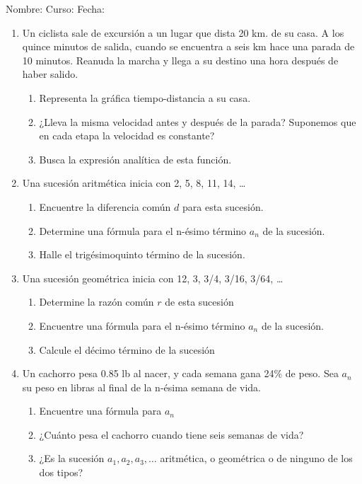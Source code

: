 \documentclass[letterpaper,fleqn]{article}
\newcommand{\LineaNombre}{%
\par
\vspace{\baselineskip}
Nombre:\hrulefill \; Curso: \underline{\hspace*{48pt}} \; Fecha: \underline{\hspace*{2.5cm}} \relax
\par}
\begin{document}
\LineaNombre
\begin{enumerate}
\item Un ciclista sale de excursión a un lugar que dista 20 km. de su casa. A los quince minutos de salida, cuando se encuentra a seis km hace una parada de 10 minutos. Reanuda la marcha y llega a su destino una hora después de haber salido.
\begin{enumerate}
\item Representa la gráfica tiempo-distancia a su casa. \noanswer
\item ¿Lleva la misma velocidad antes y después de la parada? Suponemos que en cada etapa la velocidad es constante?\noanswer
\item Busca la expresión analítica de esta función.\noanswer
\end{enumerate}


\item Una sucesión aritmética inicia con 2, 5, 8, 11, 14, \ldots
\begin{enumerate}
\item Encuentre la diferencia común $d$ para esta sucesión.\noanswer
\item Determine una fórmula para el n-ésimo término $a_{n}$ de la sucesión.\noanswer
\item Halle el trigésimoquinto término de la sucesión.\noanswer
\end{enumerate}
\item Una sucesión geométrica inicia con 12, 3, 3/4, 3/16, 3/64, \ldots
\begin{enumerate}
\item Determine la razón común $r$ de esta sucesión \noanswer
\item Encuentre una fórmula para el n-ésimo término $a_{n}$ de la sucesión.\noanswer
\item Calcule el décimo término de la sucesión\noanswer
\end{enumerate}
 \item Un cachorro pesa 0.85 lb al nacer, y cada semana gana 24\% de peso. Sea $a_{n}$ su peso en libras al final de la n-ésima semana de vida.
\begin{enumerate}
\item Encuentre una fórmula para $a_{n}$\noanswer
\item ¿Cuánto pesa el cachorro cuando tiene seis semanas de vida?\noanswer
\item ¿Es la sucesión $a_{1},a_{2},a_{3},\ldots$ aritmética, o geométrica o de ninguno de los dos tipos?\noanswer
\end{enumerate}
 \end{enumerate}
\end{document}
